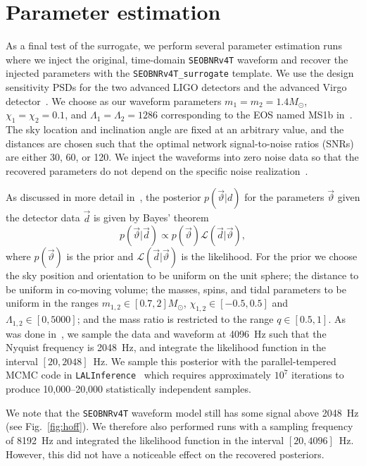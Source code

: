 \documentclass[prd,aps,letter,twocolumn,floatfix,notitlepage,nofootinbib]{revtex4-1}
\begin{document}
\section{Parameter estimation}
\label{sec:pe}

As a final test of the surrogate, we perform several parameter estimation runs where we inject the original, time-domain \texttt{SEOBNRv4T} waveform and recover the injected parameters with the \texttt{SEOBNRv4T\_surrogate} template. We use the design sensitivity PSDs for the two advanced LIGO detectors and the advanced Virgo detector~\cite{Aasi:2013wya}. We choose as our waveform parameters $m_1=m_2=1.4M_\odot$, $\chi_1=\chi_2=0.1$, and $\Lambda_1=\Lambda_2=1286$ corresponding to the EOS named MS1b in~\cite{ReadLackey2009}. The sky location and inclination angle are fixed at an arbitrary value, and the distances are chosen such that the optimal network signal-to-noise ratios (SNRs) are either 30, 60, or 120. We inject the waveforms into zero noise data so that the recovered parameters do not depend on the specific noise realization~\cite{NissankeHolzHughes2010}.

As discussed in more detail in~\cite{BNSPE}, the posterior $p(\vec\vartheta | d)$ for the parameters $\vec\vartheta$ given the detector data $\vec d$ is given by Bayes' theorem
\begin{equation}
p(\vec\vartheta | \vec d) \propto p(\vec\vartheta) \mathcal{L}(\vec d | \vec\vartheta),
\end{equation}
where $p(\vec\vartheta)$ is the prior and $\mathcal{L}(\vec d | \vec\vartheta)$ is the likelihood. 
For the prior we choose the sky position and orientation to be uniform on the unit sphere; the distance to be uniform in co-moving volume; the masses, spins, and tidal parameters to be uniform in the ranges $m_{1, 2} \in [0.7, 2]M_\odot$, $\chi_{1,2} \in [-0.5, 0.5]$ and $\Lambda_{1,2} \in [0, 5000]$; and the mass ratio is restricted to the range $q\in[0.5, 1]$. 
As was done in~\cite{BNSPE}, we sample the data and waveform at 4096~Hz such that the Nyquist frequency is 2048~Hz, and integrate the likelihood function in the interval $[20, 2048]$~Hz. We sample this posterior with the parallel-tempered MCMC code in \texttt{LALInference}~\cite{lal} which requires approximately $10^7$ iterations to produce 10,000--20,000 statistically independent samples. 

We note that the \texttt{SEOBNRv4T} waveform model still has some signal above 2048~Hz (see Fig.~\ref{fig:hoff}). We therefore also performed runs with a sampling frequency of 8192~Hz and integrated the likelihood function in the interval $[20, 4096]$~Hz. However, this did not have a noticeable effect on the recovered posteriors.
\end{document}
